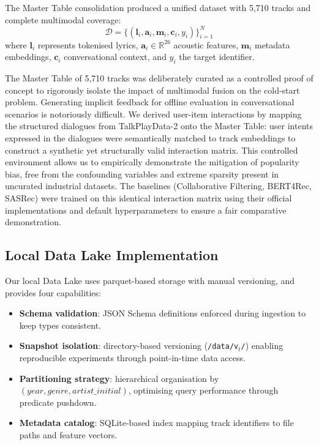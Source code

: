 \documentclass[]{ceurart}
\newcommand{\vect}[1]{\boldsymbol{#1}}
\newcommand{\Real}{\mathbb{R}}
\begin{document}
The Master Table consolidation produced a unified dataset with 5,710 tracks and
complete multimodal coverage:
\begin{equation}
\mathcal{D} = \{(\vect{l}_i, \vect{a}_i, \vect{m}_i, \vect{c}_i, y_i)\}_{i=1}^{N}
\label{eq:master}
\end{equation}
where $\vect{l}_i$ represents tokenised lyrics, $\vect{a}_i \in \Real^{26}$
acoustic features, $\vect{m}_i$ metadata embeddings, $\vect{c}_i$ conversational
context, and $y_i$ the target identifier.

The Master Table of 5,710 tracks was deliberately curated as a controlled proof
of concept to rigorously isolate the impact of multimodal fusion on the
cold-start problem. Generating implicit feedback for offline evaluation in
conversational scenarios is notoriously difficult. We derived user-item
interactions by mapping the structured dialogues from TalkPlayData-2 onto the
Master Table: user intents expressed in the dialogues were semantically matched
to track embeddings to construct a synthetic yet structurally valid interaction
matrix. This controlled environment allows us to empirically demonstrate the
mitigation of popularity bias, free from the confounding variables and extreme
sparsity present in uncurated industrial datasets. The baselines
(Collaborative Filtering, BERT4Rec, SASRec) were trained on this identical
interaction matrix using their official implementations and default
hyperparameters to ensure a fair comparative demonstration.

\subsection{Local Data Lake Implementation}
Our local Data Lake uses parquet-based storage with manual versioning, and
provides four capabilities:
\begin{itemize}
  \item \textbf{Schema validation}: JSON Schema definitions enforced during
    ingestion to keep types consistent.
  \item \textbf{Snapshot isolation}: directory-based versioning
    (\texttt{/data/v$_{t}$/}) enabling reproducible experiments through
    point-in-time data access.
  \item \textbf{Partitioning strategy}: hierarchical organisation by
    $(\textit{year}, \textit{genre}, \textit{artist\_initial})$, optimising
    query performance through predicate pushdown.
  \item \textbf{Metadata catalog}: SQLite-based index mapping track identifiers
    to file paths and feature vectors.
\end{itemize}
\end{document}
